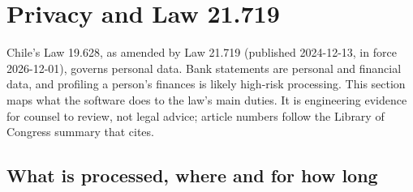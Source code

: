 \section{Privacy and Law 21.719}\label{sec:privacy}

Chile's Law 19.628, as amended by Law 21.719 (published 2024-12-13, in force 2026-12-01), governs personal data. Bank
statements are personal and financial data, and profiling a person's finances is likely high-risk processing. This
section maps what the software does to the law's main duties. It is engineering evidence for counsel to review, not
legal advice; article numbers follow the Library of Congress summary that  cites.

\subsection{What is processed, where and for how long}


